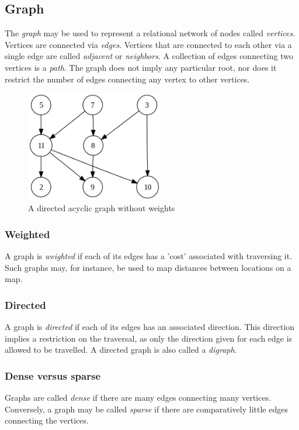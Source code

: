 \documentclass{article}
\begin{document}


\subsection{Graph}
The {\em graph} may be used to represent a relational network of nodes called {\em vertices}.
Vertices are connected via {\em edges}. Vertices that are connected to each other via a single edge are called
{\em adjacent} or {\em neighbors}. A collection of edges connecting two vertices is a {\em path}. The graph does
not imply any particular root, nor does it restrict the number of edges connecting any vertex to other vertices.

\begin{figure}[H]
  \centering
  \includegraphics[width=6cm]{graph}
  \caption{A directed acyclic graph without weights}
\end{figure}

\subsubsection{Weighted}
A graph is {\em weighted} if each of its edges has a 'cost' associated with traversing it.
Such graphs may, for instance, be used to map distances between locations on a map.

\subsubsection{Directed}
A graph is {\em directed} if each of its edges has an associated direction. This direction implies a restriction
on the traversal, as only the direction given for each edge is allowed to be travelled. A directed graph is also
called a {\em digraph}.

\subsubsection{Dense versus sparse}
Graphs are called {\em dense} if there are many edges connecting many vertices.
Conversely, a graph may be called {\em sparse} if there are comparatively little edges connecting the vertices.
\end{document}
